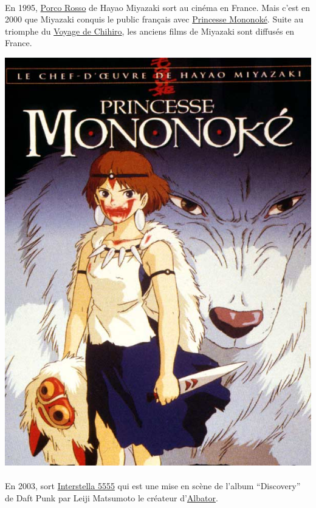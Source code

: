 \paragraph{} En 1995, \underline{Porco Rosso} de Hayao Miyazaki sort au cinéma
en France. Mais c'est en 2000 que Miyazaki conquis le public français avec
\underline{Princesse Mononoké}. Suite au triomphe du \underline{Voyage de
Chihiro}, les anciens films de Miyazaki sont diffusés en France.

\begin{center}
	\includegraphics[scale=0.2]{miyazaki.jpg}
\end{center}

\paragraph{} En 2003, sort \underline{Interstella 5555} qui est une mise en
scène de l'album ``Discovery'' de Daft Punk par Leiji Matsumoto le créateur
d'\underline{Albator}.

